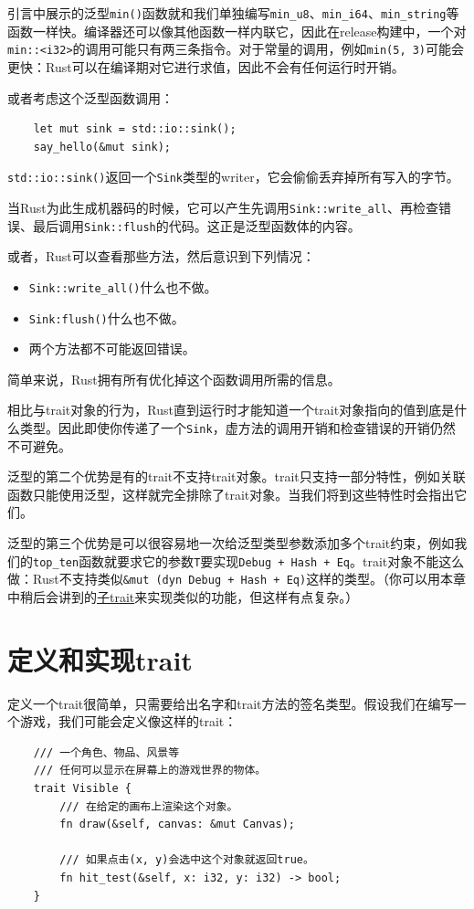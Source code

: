 引言中展示的泛型\texttt{min()}函数就和我们单独编写\texttt{min\_u8}、\texttt{min\_i64}、\texttt{min\_string}等函数一样快。编译器还可以像其他函数一样内联它，因此在release构建中，一个对\texttt{min::<i32>}的调用可能只有两三条指令。对于常量的调用，例如\texttt{min(5, 3)}可能会更快：Rust可以在编译期对它进行求值，因此不会有任何运行时开销。

或者考虑这个泛型函数调用：
\begin{verbatim}
    let mut sink = std::io::sink();
    say_hello(&mut sink);
\end{verbatim}

\texttt{std::io::sink()}返回一个\texttt{Sink}类型的writer，它会偷偷丢弃掉所有写入的字节。

当Rust为此生成机器码的时候，它可以产生先调用\texttt{Sink::write\_all}、再检查错误、最后调用\texttt{Sink::flush}的代码。这正是泛型函数体的内容。

或者，Rust可以查看那些方法，然后意识到下列情况：
\begin{itemize}
    \item \texttt{Sink::write\_all()}什么也不做。
    \item \texttt{Sink:flush()}什么也不做。
    \item 两个方法都不可能返回错误。
\end{itemize}

简单来说，Rust拥有所有优化掉这个函数调用所需的信息。

相比与trait对象的行为，Rust直到运行时才能知道一个trait对象指向的值到底是什么类型。因此即使你传递了一个\texttt{Sink}，虚方法的调用开销和检查错误的开销仍然不可避免。

泛型的第二个优势是有的trait不支持trait对象。trait只支持一部分特性，例如关联函数只能使用泛型，这样就完全排除了trait对象。当我们将到这些特性时会指出它们。

泛型的第三个优势是可以很容易地一次给泛型类型参数添加多个trait约束，例如我们的\texttt{top\_ten}函数就要求它的参数\texttt{T}要实现\texttt{Debug + Hash + Eq}。trait对象不能这么做：Rust不支持类似\texttt{\&mut (dyn Debug + Hash + Eq)}这样的类型。（你可以用本章中稍后会讲到的\hyperref[subtrait]{子trait}来实现类似的功能，但这样有点复杂。）

\section{定义和实现trait}

定义一个trait很简单，只需要给出名字和trait方法的签名类型。假设我们在编写一个游戏，我们可能会定义像这样的trait：
\begin{verbatim}
    /// 一个角色、物品、风景等
    /// 任何可以显示在屏幕上的游戏世界的物体。
    trait Visible {
        /// 在给定的画布上渲染这个对象。
        fn draw(&self, canvas: &mut Canvas);

        /// 如果点击(x, y)会选中这个对象就返回true。
        fn hit_test(&self, x: i32, y: i32) -> bool;
    }
\end{verbatim}

